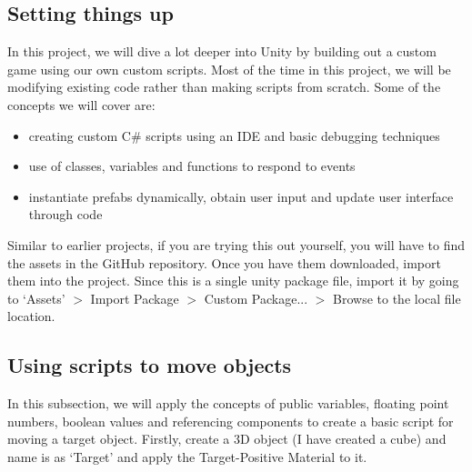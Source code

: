 \documentclass{article}[a4paper,12pt]
\theoremstyle{definition}
\begin{document}
\subsection{Setting things up}
In this project, we will dive a lot deeper into Unity by building out a custom game using our own custom scripts. Most of the time in this project, we will be modifying existing code rather than making scripts from scratch. Some of the concepts we will cover are:
\begin{itemize}
	\item creating custom C\# scripts using an IDE and basic debugging techniques
	\item use of classes, variables and functions to respond to events
	\item instantiate prefabs dynamically, obtain user input and update user interface through code
\end{itemize}
Similar to earlier projects, if you are trying this out yourself, you will have to find the assets in the GitHub repository. Once you have them downloaded, import them into the project. Since this is a single unity package file, import it by going to `Assets' $>$ Import Package $>$ Custom Package... $>$ Browse to the local file location.

\subsection{Using scripts to move objects}
In this subsection, we will apply the concepts of public variables, floating point numbers, boolean values and referencing components to create a basic script for moving a target object. Firstly, create a 3D object (I have created a cube) and name is as `Target' and apply the Target-Positive Material to it.
\end{document}
